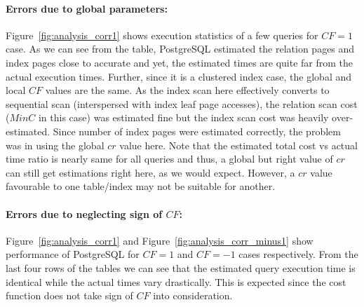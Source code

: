 \documentclass{article}
\begin{document}
\begin{multicols}{2}
	\paragraph{Errors due to global parameters:} Figure~\ref{fig:analysis_corr1} shows execution statistics of a few queries for $CF = 1$ case. As we can see from the table, PostgreSQL estimated the relation pages and index pages close to accurate and yet, the estimated times are quite far from the actual execution times. Further, since it is a clustered index case, the global and local $CF$ values are the same. As the index scan here effectively converts to sequential scan (interspersed with index leaf page accesses), the relation scan cost ($MinC$ in this case) was estimated fine but the index scan cost was heavily over-estimated. Since number of index pages were estimated correctly, the problem was in using the global $cr$ value here. Note that the estimated total cost vs actual time ratio is nearly same for all queries and thus, a global but right value of $cr$ can still get estimations right here, as we would expect. However, a $cr$ value favourable to one table/index may not be suitable for another.
		
	\paragraph{Errors due to neglecting sign of $CF$:} Figure~\ref{fig:analysis_corr1} and Figure~\ref{fig:analysis_corr_minus1} show performance of PostgreSQL for $CF = 1$ and $CF = -1$ cases respectively. From the last four rows of the tables we can see that the estimated query execution time is identical while the actual times vary drastically. This is expected since the cost function does not take sign of $CF$ into consideration.
	

\end{multicols}
\end{document}
